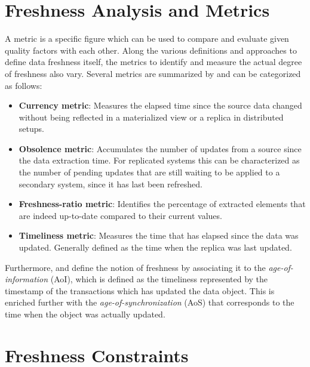 \section{Freshness Analysis and Metrics}
\label{r:freshness_metrics}
A metric is a specific figure which can be used to compare and evaluate given quality factors with each other.
Along the various definitions and approaches to define data freshness itself, the metrics to identify and measure the actual degree of freshness also vary.
Several metrics are summarized by \cite{cho:2000, pacitti:2000, peralta:2006} and can be categorized as follows:
\begin{itemize}
    \item \textbf{Currency metric}: Measures the elapsed time since the source data changed without being reflected in a materialized view or a replica in distributed setups.
    \item \textbf{Obsolence metric}: Accumulates the number of updates from a source since the data extraction time. For replicated systems this can be characterized as the 
    number of pending updates that are still waiting to be applied to a secondary system, since it has last been refreshed.
    \item \textbf{Freshness-ratio metric}: Identifies the percentage of extracted elements that are indeed up-to-date compared to their current values.
    \item \textbf{Timeliness metric}: Measures the time that has elapsed since the data was updated. Generally defined as the time when the replica was last updated.
\end{itemize}


Furthermore, \cite{bedewy:2016} and \cite{zhong:2018} define the notion of freshness by associating it to the \emph{age-of-information} (AoI),
which is defined as the timeliness represented by the timestamp of the transactions which has updated the data object. 
This is enriched further with the \emph{age-of-synchronization} (AoS) that corresponds to the time when the object was actually updated.




\section{Freshness Constraints}
\label{r:express_freshness}

